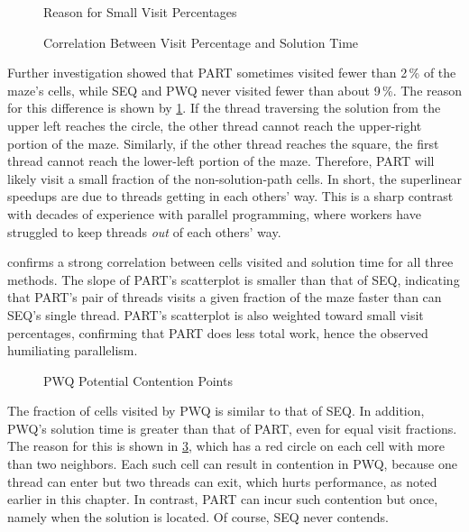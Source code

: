 \begin{figure}
\centering
{}
\caption{Reason for Small Visit Percentages}
\label{fig:SMPdesign:Reason for Small Visit Percentages}
\end{figure}

\begin{figure}
\centering
{}
\caption{Correlation Between Visit Percentage and Solution Time}
\label{fig:SMPdesign:Correlation Between Visit Percentage and Solution Time}
\end{figure}

Further investigation showed that
PART sometimes visited fewer than 2\,\% of the maze's cells,
while SEQ and PWQ never visited fewer than about 9\,\%.
The reason for this difference is shown by
\cref{fig:SMPdesign:Reason for Small Visit Percentages}.
If the thread traversing the solution from the upper left reaches
the circle, the other thread cannot reach
the upper-right portion of the maze.
Similarly, if the other thread reaches the square,
the first thread cannot reach the lower-left
portion of the maze.
Therefore, PART will likely visit a small fraction
of the non-solution-path cells.
In short, the superlinear speedups are due to threads getting in each
others' way.
This is a sharp contrast with decades of experience with
parallel programming, where workers have struggled
to keep threads \emph{out} of each others' way.

confirms a strong correlation between cells visited and solution time
for all three methods.
The slope of PART's scatterplot is smaller than that of SEQ,
indicating that PART's pair of threads visits a given fraction
of the maze faster than can SEQ's single thread.
PART's scatterplot is also weighted toward small visit
percentages, confirming that PART does less total work, hence
the observed humiliating parallelism.

\begin{figure}
\centering
{}
\caption{PWQ Potential Contention Points}
\label{fig:SMPdesign:PWQ Potential Contention Points}
\end{figure}

The fraction of cells visited by PWQ is similar to that of SEQ\@.
In addition, PWQ's solution time is greater than that of PART,
even for equal visit fractions.
The reason for this is shown in
\cref{fig:SMPdesign:PWQ Potential Contention Points}, which has a red
circle on each cell with more than two neighbors.
Each such cell can result in contention in PWQ, because
one thread can enter but two threads can exit, which hurts
performance, as noted earlier in this chapter.
In contrast, PART can incur such contention but once, namely
when the solution is located.
Of course, SEQ never contends.

